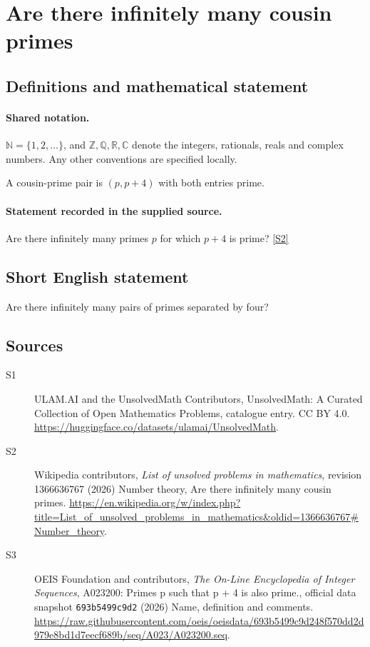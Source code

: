 \documentclass[11pt]{article}
\newcommand{\sref}[2]{\hyperlink{source:#1:#2}{[S#2]}}
\begin{document}
\section{Are there infinitely many cousin primes}\label{statement}

\subsection{Definitions and mathematical statement}

\paragraph{Shared notation.}$\mathbb N=\{1,2,\ldots\}$, and $\mathbb Z,\mathbb Q,\mathbb R,\mathbb C$ denote the integers, rationals, reals and complex numbers. Any other conventions are specified locally.


A cousin-prime pair is $(p,p+4)$ with both entries prime.
\paragraph{Statement recorded in the supplied source.}
Are there infinitely many primes $p$ for which $p+4$ is prime? \sref{statement}{2}
\subsection{Short English statement}
Are there infinitely many pairs of primes separated by four?
\subsection{Sources}
\begin{description}
\item[\hypertarget{source:statement:1}{S1}] ULAM.AI and the UnsolvedMath Contributors, UnsolvedMath: A Curated Collection of Open Mathematics Problems, catalogue entry. CC BY 4.0. \url{https://huggingface.co/datasets/ulamai/UnsolvedMath}.
\item[\hypertarget{source:statement:2}{S2}] Wikipedia contributors, \emph{List of unsolved problems in mathematics}, revision 1366636767 (2026) Number theory, Are there infinitely many cousin primes. \url{https://en.wikipedia.org/w/index.php?title=List_of_unsolved_problems_in_mathematics&oldid=1366636767#Number_theory}.
\item[\hypertarget{source:statement:3}{S3}] OEIS Foundation and contributors, \emph{The On-Line Encyclopedia of Integer Sequences}, A023200: Primes p such that p + 4 is also prime., official data snapshot \texttt{693b5499c9d2} (2026) Name, definition and comments. \url{https://raw.githubusercontent.com/oeis/oeisdata/693b5499c9d248f570dd2d979e8bd1d7eecf689b/seq/A023/A023200.seq}.
\end{description}
\label{end:statement}
\end{document}
